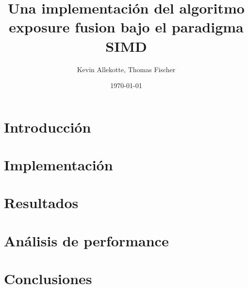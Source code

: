 \documentclass[a4paper,10pt]{article}
\title{Una implementación del algoritmo exposure fusion bajo el paradigma SIMD}
\author{Kevin Allekotte, Thomas Fischer}
\date{\today}
\begin{document}
    \maketitle

    \begin{abstract}

    \end{abstract}

    \section{Introducción}

    \section{Implementación}

    \section{Resultados}

    \section{Análisis de performance}

    \section{Conclusiones}

    
    
\end{document}
